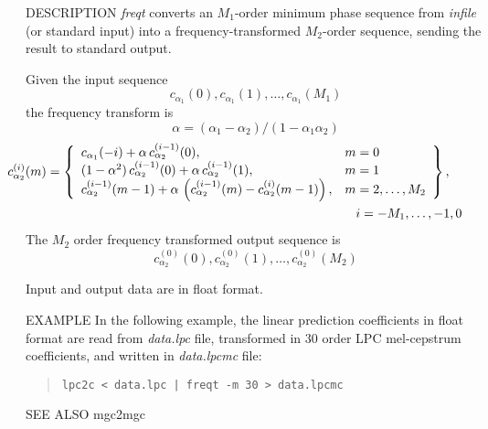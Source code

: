 \begin{qsection}{DESCRIPTION}
{\em freqt} converts an $M_1$-order minimum phase sequence 
from {\em infile} (or standard input) 
into a frequency-transformed $M_2$-order sequence,
sending the result to standard output.

Given the input sequence
\begin{displaymath}
c_{\alpha_1}(0), c_{\alpha_1}(1), \ldots, c_{\alpha_1}(M_1)
\end{displaymath}
the frequency transform is
\[ \alpha = (\alpha_1 - \alpha_2) / (1 - \alpha_1 \alpha_2) \]
\begin{eqnarray*} 
\hspace{-15mm}&& c_{\alpha_2}^{(i)}(m) = \left\{ 
	\begin{array}{ll}
          c_{\alpha_1}(-i)
	    +\alpha\,c_{\alpha_2}^{(i-1)}(0), &  m=0 \\
          (1-\alpha^2)\,c_{\alpha_2}^{(i-1)}(0)
            +\alpha\,c_{\alpha_2}^{(i-1)}(1), &  m=1 \\
          c_{\alpha_2}^{(i-1)}(m-1) 
	    +\alpha\, \left(c_{\alpha_2}^{(i-1)}(m)
	    -c_{\alpha_2}^{(i)}(m-1)\right), &   m=2,\ldots,M_2
         \end{array} \right\}, \quad \nonumber \\
\hspace{-15mm}&& \hspace{80mm} i = -M_1,\ldots,-1,0 
\end{eqnarray*}
The $M_2$ order frequency transformed output sequence is
\begin{displaymath}
c_{\alpha_2}^{(0)}(0), c_{\alpha_2}^{(0)}(1), \ldots, c_{\alpha_2}^{(0)}(M_2)
\end{displaymath}
\par
Input and output data are in float format.
\end{qsection}

\begin{options}
\end{options}

\begin{qsection}{EXAMPLE}
In the following example, the linear prediction coefficients in
float format are read from {\em data.lpc} file, 
transformed in 30 order LPC mel-cepstrum coefficients,
and written in {\em data.lpcmc} file:
\begin{quote}
 \verb!lpc2c < data.lpc | freqt -m 30 > data.lpcmc!
\end{quote} 
\end{qsection}

\begin{qsection}{SEE ALSO}
mgc2mgc
\end{qsection}
